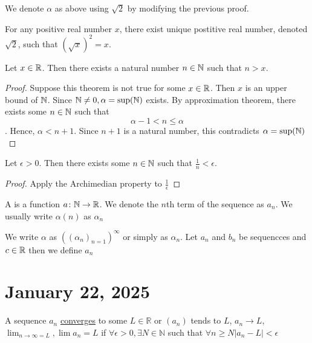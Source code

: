 \documentclass[11pt]{article}
\begin{document}
\begin{remark}
	We denote \(\alpha\) as above using \(\sqrt{2}\) by modifying the previous proof.
\end{remark}

\begin{theorem}
	For any positive real number \(x\), there exist unique postitive real number, denoted \(\sqrt{2}\), such that \((\sqrt{x})^2 = x\).
\end{theorem}

\begin{theorem}
	Let \(x \in \mathbb R\). Then there exists a natural number \(n \in \mathbb N\) such that \(n > x\).
\end{theorem}

\begin{proof}
	Suppose this theorem is not true for some \(x \in \mathbb R\). Then \(x\) is an upper bound of \(\mathbb N\). Since \(\mathbb N \neq 0, \alpha = \sup(\mathbb N)\) exists. By approximation theorem, there exists some \(n \in \mathbb N\) such that \[\alpha - 1< n \leqslant \alpha \]. Hence, \(\alpha < n +1\). Since \(n + 1\) is a natural number, this contradicts \(\alpha = \sup(\mathbb N)\)
\end{proof}
\begin{corollary}
	Let \(\epsilon > 0\). Then there exists some \(n \in \mathbb N\) such that \(\frac{1}{n} < \epsilon\).
\end{corollary}
\begin{proof}
	Apply the Archimedian property to \(\frac{1}{\epsilon}\)
\end{proof}

\begin{definition}
	A  is a function \(a \colon \mathbb N \to \mathbb R\). We denote the \(n\)th term of the sequence as \(a_n\). We usually write \(\alpha(n)\) as \(\alpha_n\)
\end{definition}

We write \(\alpha\) as \(((\alpha_n)_{n = 1})^\infty\) or simply as
\(\alpha_n\). Let \(a_n\) and \(b_n\) be sequencces and \(c \in \mathbb R\) then we
define \(a_n\)

\section{January 22, 2025}
\begin{definition}
	A sequence \(a_n\) \underline{converges} to some \(L \in \mathbb{R}\) or \((a_n)\) tends to \(L\), \(a_n \rightarrow L\), \(\lim_{n \rightarrow \infty = L}, \lim a_n = L\) if \(\forall \epsilon > 0, \exists  N \in \mathbb{N}\) such that \(\forall n \geqslant N |a_n - L| < \epsilon\)
\end{definition}
\end{document}
